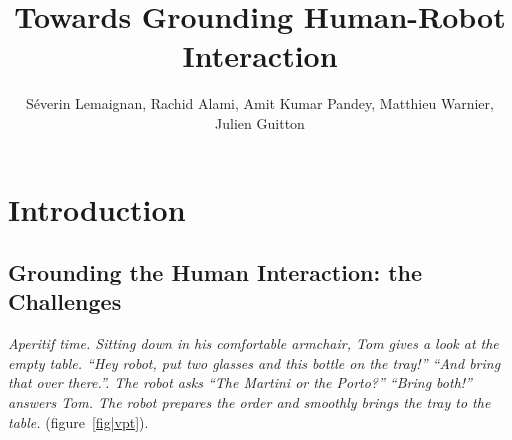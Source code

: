 \documentclass{svmult}
\begin{document}


\title*{Towards Grounding Human-Robot Interaction}

\author{
Séverin Lemaignan,
Rachid Alami,
Amit Kumar Pandey,
Matthieu Warnier,
Julien Guitton
}


\maketitle


\section{Introduction}

\subsection{Grounding the Human Interaction: the Challenges}

{\em Aperitif time. Sitting down in his comfortable armchair, Tom gives a look
at the empty table. ``{\em Hey robot, put two glasses and this bottle on the
tray!}'' ``{\em And bring that over there.}''. The robot asks ``{\em The
Martini or the Porto?}'' ``{\em Bring both!}'' answers Tom. The robot prepares
the order and smoothly brings the tray to the table.} (figure~\ref{fig|vpt}).
\end{document}
